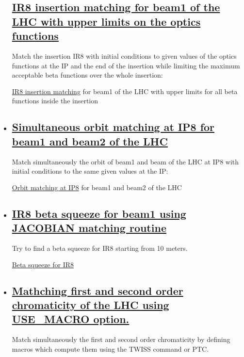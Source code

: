 \begin{itemize}
\subsection{\href{cell}{IR8 insertion matching for beam1 of the LHC with upper limits on the optics functions}} Match the insertion IR8 with initial conditions to given values of the optics  functions at the IP and the end of the insertion while limiting the maximum acceptable beta functions over the whole insertion: 

\href{http://cern.ch/madx/madX/examples/match/lhc.insertion-upper/job.lhc.insertion-upper.madx}{IR8 insertion matching} for beam1 of the LHC with upper limits for all beta functions inside the insertion
	\item 

\subsection{\href{cell}{Simultaneous orbit matching at IP8 for beam1 and beam2 of the LHC}} Match simultaneously the orbit of beam1 and beam of the LHC at IP8  with initial conditions to the same given values at the IP: 

\href{http://cern.ch/madx/madX/examples/match/lhc.iporbit/job.lhc.iporbit.madx}{Orbit matching at IP8} for beam1 and beam2 of the LHC
	\item 

\subsection{\href{cell}{IR8 beta squeeze for beam1 using JACOBIAN matching routine}} Try to find a beta squeeze for IR8 starting from 10 meters. 

\href{http://cern.ch/madx/madX/examples/match/lhcV65.ir8squeeze/job.lhcV65.ir8squeeze.madx}{Beta squeeze for IR8}%
	\item 

\subsection{\href{cell}{Mathching first and second order chromaticity of the LHC using USE\_MACRO option.}} Match simultaneously the first and second order chromaticity by defining macros which compute them using the TWISS command or PTC. 


\end{itemize}
